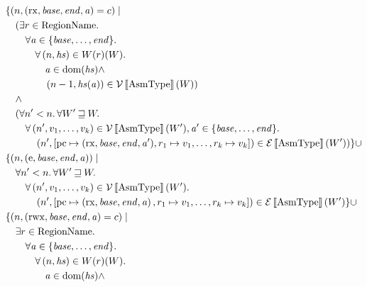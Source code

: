 \documentclass{article}
\newcommand{\sem}[1]{\left\llbracket #1 \right\rrbracket}
\newcommand{\union}{\mathbin{\cup}}
\DeclareMathOperator{\dom}{dom}
\newcommand{\var}[1]{\mathit{#1}}
\newcommand{\pcreg}{\mathrm{pc}}
\newcommand{\addr}{\var{a}}
\newcommand{\start}{\var{base}}
\newcommand{\addrend}{\var{end}}
\newcommand{\heapseg}{\var{hs}}
\newcommand{\perm}{\var{perm}}
\newcommand{\stdcap}[1][\perm]{\left(#1,\start,\addrend,\addr \right)}
\newcommand{\future}{\mathbin{\sqsupseteq}}
\newcommand{\asmType}{\plaindom{AsmType}}
\newcommand{\plaindom}[1]{\mathrm{#1}}
\newcommand{\RegionName}{\plaindom{RegionName}}
\newcommand{\intr}[2]{\mathcal{#1}\sem{#2}}
\newcommand{\valueintr}[1]{\intr{V}{#1}}
\newcommand{\exprintr}[1]{\intr{E}{#1}}
\newcommand{\stdvr}{\valueintr{\asmType}}
\newcommand{\stder}{\exprintr{\asmType}}
\newcommand{\npair}[2][n]{\left(#1,#2 \right)}
\newcommand{\plainperm}[1]{\mathrm{#1}}
\newcommand{\exec}{\plainperm{rx}}
\newcommand{\entry}{\plainperm{e}}
\newcommand{\rwx}{\plainperm{rwx}}
\begin{document}
\begin{align*}
                   & \{ \npair{\stdcap[\exec] = c} \mid \\
                   & \quad (\exists r \in \RegionName \ldotp \\
                   & \qquad  \forall \addr \in \{\start, \dots, \addrend \} \ldotp \\
                   & \qquad \quad  \forall \npair{\heapseg} \in W(r)(W)\ldotp \\
                   & \qquad \qquad   \addr \in \dom(\heapseg) \land \\
                   & \qquad \qquad   \npair[n-1]{\heapseg(\addr)} \in \stdvr(W)) \\
                   & \quad \land \\
                   & \quad (\forall n' < n \ldotp \forall W' \future W \ldotp \\
                   & \qquad \forall \npair[n']{v_1,\dots,v_k} \in \stdvr(W'),\addr' \in \{\start, \dots, \addrend \} \ldotp \\
                   & \qquad \quad \npair[n']{[\pcreg \mapsto (\exec,\start,\addrend,\addr'), r_1 \mapsto v_1, \dots , r_k \mapsto v_k]} \in \stder(W')) \}
\union \\
                   & \{ \npair{\stdcap[\entry]} \mid \\
                   & \quad \forall n' < n \ldotp \forall W' \future W \ldotp \\
                   & \qquad \forall \npair[n']{v_1,\dots,v_k} \in \stdvr(W') \ldotp \\
                   & \qquad \quad \npair[n']{[\pcreg \mapsto \stdcap[\exec], r_1 \mapsto v_1, \dots , r_k \mapsto v_k]} \in \stder(W') \}
\union \\
                   & \{ \npair{\stdcap[\rwx] = c} \mid \\
                   & \quad \exists r \in \RegionName \ldotp \\
                   & \qquad  \forall \addr \in \{\start, \dots, \addrend \} \ldotp \\
                   & \qquad \quad  \forall \npair{\heapseg} \in W(r)(W)\ldotp \\
                   & \qquad \qquad   \addr \in \dom(\heapseg) \land \\

\end{align*}
\end{document}
